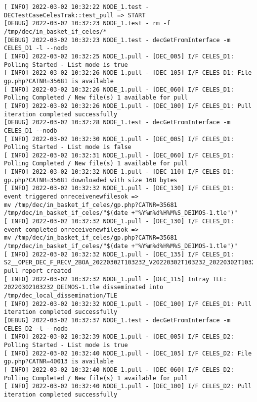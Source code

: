 \documentclass[dec_sum_main.tex]{subfiles}
\begin{document}
 \newline

\begin{Verbatim}[fontsize=\tiny]
[ INFO] 2022-03-02 10:32:22 NODE_1.test - DECTestCaseCelesTrak::test_pull => START
[DEBUG] 2022-03-02 10:32:23 NODE_1.test - rm -f /tmp/dec/in_basket_if_celes/*
[DEBUG] 2022-03-02 10:32:23 NODE_1.test - decGetFromInterface -m CELES_D1 -l --nodb
[ INFO] 2022-03-02 10:32:25 NODE_1.pull - [DEC_005] I/F CELES_D1: Polling Started - List mode is true
[ INFO] 2022-03-02 10:32:26 NODE_1.pull - [DEC_105] I/F CELES_D1: File gp.php?CATNR=35681 is available
[ INFO] 2022-03-02 10:32:26 NODE_1.pull - [DEC_060] I/F CELES_D1: Polling Completed / New file(s) 1 available for pull
[ INFO] 2022-03-02 10:32:26 NODE_1.pull - [DEC_100] I/F CELES_D1: Pull iteration completed successfully
[DEBUG] 2022-03-02 10:32:28 NODE_1.test - decGetFromInterface -m CELES_D1 --nodb
[ INFO] 2022-03-02 10:32:30 NODE_1.pull - [DEC_005] I/F CELES_D1: Polling Started - List mode is false
[ INFO] 2022-03-02 10:32:31 NODE_1.pull - [DEC_060] I/F CELES_D1: Polling Completed / New file(s) 1 available for pull
[ INFO] 2022-03-02 10:32:32 NODE_1.pull - [DEC_110] I/F CELES_D1: gp.php?CATNR=35681 downloaded with size 168 bytes
[ INFO] 2022-03-02 10:32:32 NODE_1.pull - [DEC_130] I/F CELES_D1: event triggered onreceivenewfilesok => 
mv /tmp/dec/in_basket_if_celes/gp.php?CATNR=35681 /tmp/dec/in_basket_if_celes/"$(date +"%Y%m%d%H%M%S_DEIMOS-1.tle")"
[ INFO] 2022-03-02 10:32:32 NODE_1.pull - [DEC_130] I/F CELES_D1: event completed onreceivenewfilesok => 
mv /tmp/dec/in_basket_if_celes/gp.php?CATNR=35681 /tmp/dec/in_basket_if_celes/"$(date +"%Y%m%d%H%M%S_DEIMOS-1.tle")"
[ INFO] 2022-03-02 10:32:32 NODE_1.pull - [DEC_135] I/F CELES_D1: S2__OPER_DEC_F_RECV_2BOA_20220302T103232_V20220302T103232_20220302T103232_CELES_D1.xml pull report created
[ INFO] 2022-03-02 10:32:32 NODE_1.pull - [DEC_115] Intray TLE: 20220302103232_DEIMOS-1.tle disseminated into /tmp/dec_local_dissemination/TLE
[ INFO] 2022-03-02 10:32:32 NODE_1.pull - [DEC_100] I/F CELES_D1: Pull iteration completed successfully
[DEBUG] 2022-03-02 10:32:37 NODE_1.test - decGetFromInterface -m CELES_D2 -l --nodb
[ INFO] 2022-03-02 10:32:39 NODE_1.pull - [DEC_005] I/F CELES_D2: Polling Started - List mode is true
[ INFO] 2022-03-02 10:32:40 NODE_1.pull - [DEC_105] I/F CELES_D2: File gp.php?CATNR=40013 is available
[ INFO] 2022-03-02 10:32:40 NODE_1.pull - [DEC_060] I/F CELES_D2: Polling Completed / New file(s) 1 available for pull
[ INFO] 2022-03-02 10:32:40 NODE_1.pull - [DEC_100] I/F CELES_D2: Pull iteration completed successfully

\end{Verbatim}
\end{document}
